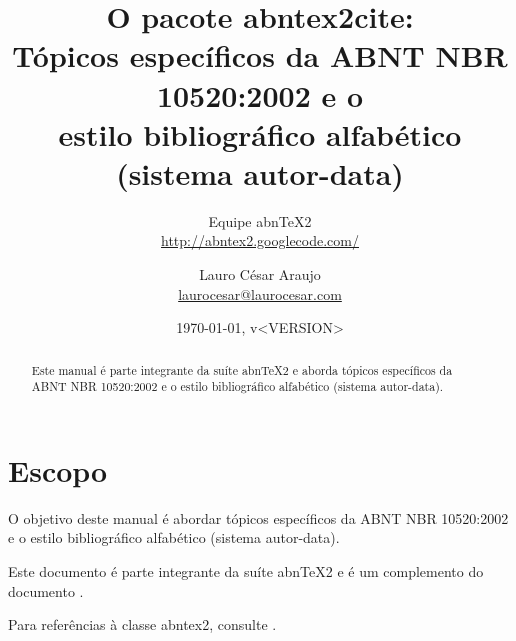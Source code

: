 \documentclass[a4paper]{ltxdoc}
\begin{document}
\nocite{7.2.2-2}
\nocite{7.3.2-3} %
\nocite{7.5.1.2-1}
\nocite{8.11.3-1} %

\newcommand{\titulo}{\textbf{O pacote \textsf{abntex2cite}}:\\ \Large{Tópicos
específicos da ABNT NBR 10520:2002 e o \\ estilo bibliográfico alfabético
(sistema autor-data)}}

\newcommand{\abnTeX}{abn\TeX}
\newcommand{\abnTeXSite}{\url{http://abntex2.googlecode.com/}}

\title{\titulo}
\author{Equipe \abnTeX2\\\abnTeXSite 
\and 
Lauro César Araujo\\\url{laurocesar@laurocesar.com}}
\date{\today, v<VERSION>}

\maketitle


\begin{abstract}
Este manual é parte integrante da suíte \abnTeX2 e aborda tópicos específicos
da ABNT NBR 10520:2002 e o estilo bibliográfico alfabético (sistema
autor-data).
\end{abstract}


\tableofcontents

\listoftables

\section{Escopo}

O objetivo deste manual é abordar tópicos específicos da ABNT NBR 10520:2002 e
o estilo bibliográfico alfabético (sistema autor-data). 

Este documento é parte integrante da suíte \abnTeX2 e é um complemento do
documento .

Para referências à classe \textsf{abntex2}, consulte .
\end{document}
